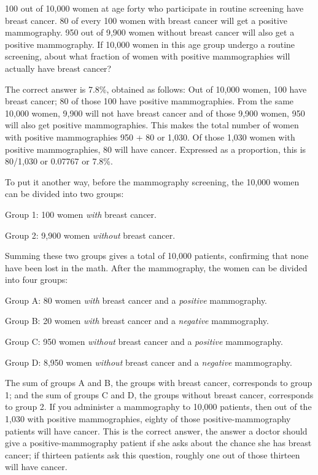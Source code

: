 {
 100 out of 10,000 women at age forty who participate in routine
screening have breast cancer. 80 of every 100 women with breast cancer
will get a positive mammography. 950 out of 9,900 women without breast
cancer will also get a positive mammography. If 10,000 women in this
age group undergo a routine screening, about what fraction of women
with positive mammographies will actually have breast cancer?}

{
 The correct answer is 7.8\%, obtained as follows: Out of 10,000
women, 100 have breast cancer; 80 of those 100 have positive
mammographies. From the same 10,000 women, 9,900 will not have breast
cancer and of those 9,900 women, 950 will also get positive
mammographies. This makes the total number of women with positive
mammographies 950 + 80 or 1,030. Of those 1,030 women with positive
mammographies, 80 will have cancer. Expressed as a proportion, this is
80/1,030 or 0.07767 or 7.8\%.}

{
 To put it another way, before the mammography screening, the
10,000 women can be divided into two groups:}

{
 Group 1: 100 women \textit{with} breast cancer.}

{
 Group 2: 9,900 women \textit{without} breast cancer.}

{
 Summing these two groups gives a total of 10,000 patients,
confirming that none have been lost in the math. After the mammography,
the women can be divided into four groups:}

{
 Group A: 80 women \textit{with} breast cancer and a
\textit{positive} mammography.}

{
 Group B: 20 women \textit{with} breast cancer and a
\textit{negative} mammography.}

{
 Group C: 950 women \textit{without} breast cancer and a
\textit{positive} mammography.}

{
 Group D: 8,950 women \textit{without} breast cancer and a
\textit{negative} mammography.}

{
 The sum of groups A and B, the groups with breast cancer,
corresponds to group 1; and the sum of groups C and D, the groups
without breast cancer, corresponds to group 2. If you administer a
mammography to 10,000 patients, then out of the 1,030 with positive
mammographies, eighty of those positive-mammography patients will have
cancer. This is the correct answer, the answer a doctor should give a
positive-mammography patient if she asks about the chance she has
breast cancer; if thirteen patients ask this question, roughly one out
of those thirteen will have cancer.}


